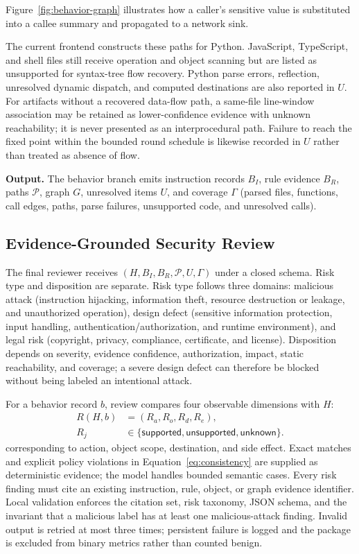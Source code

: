 Figure~\ref{fig:behavior-graph} illustrates how a caller's sensitive value is
substituted into a callee summary and propagated to a network sink.

The current frontend constructs these paths for Python. JavaScript,
TypeScript, and shell files still receive operation and object scanning but are
listed as unsupported for syntax-tree flow recovery. Python parse errors,
reflection, unresolved dynamic dispatch, and computed destinations are also
reported in $U$. For artifacts without a recovered data-flow path, a same-file
line-window association may be retained as lower-confidence evidence with
unknown reachability; it is never presented as an interprocedural path.
Failure to reach the fixed point within the bounded round schedule is likewise
recorded in $U$ rather than treated as absence of flow.

\textbf{Output.} The behavior branch emits instruction records $B_I$, rule
evidence $B_R$, paths $\mathcal{P}$, graph $G$, unresolved items $U$, and
coverage $\Gamma$ (parsed files, functions, call edges, paths, parse failures,
unsupported code, and unresolved calls).

\subsection{Evidence-Grounded Security Review}
\label{sec:review}

The final reviewer receives $(H,B_I,B_R,\mathcal{P},U,\Gamma)$ under a closed
schema. Risk type and disposition are separate. Risk type follows three
domains: malicious attack (instruction hijacking, information theft, resource
destruction or leakage, and unauthorized operation), design defect (sensitive
information protection, input handling, authentication/authorization, and
runtime environment), and legal risk (copyright, privacy, compliance,
certificate, and license). Disposition depends on severity, evidence
confidence, authorization, impact, static reachability, and coverage; a severe
design defect can therefore be blocked without being labeled an intentional
attack.

For a behavior record $b$, review compares four observable dimensions with
$H$:
\begin{equation}
\begin{aligned}
R(H,b)&=(R_a,R_o,R_d,R_e),\\
R_j&\in\{\mathsf{supported},\mathsf{unsupported},\mathsf{unknown}\}.
\end{aligned}
\label{eq:consistency}
\end{equation}
corresponding to action, object scope, destination, and side effect. Exact
matches and explicit policy violations in Equation~\ref{eq:consistency} are
supplied as deterministic evidence;
the model handles bounded semantic cases. Every risk finding must cite an
existing instruction, rule, object, or graph evidence identifier. Local
validation enforces the citation set, risk taxonomy, JSON schema, and the
invariant that a malicious label has at least one malicious-attack finding.
Invalid output is retried at most three times; persistent failure is logged and
the package is excluded from binary metrics rather than counted benign.

